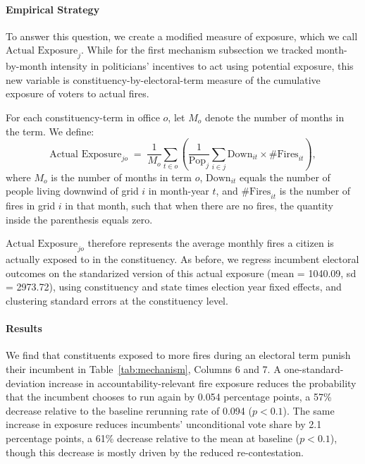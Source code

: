\documentclass[12pt]{article}
\begin{document}
\paragraph{Empirical Strategy}
To answer this question, we create a modified measure of exposure, which we call $\text{Actual Exposure}_{j}$. While for the first mechanism subsection we tracked month-by-month intensity in politicians' incentives to act using potential exposure, this new variable is constituency-by-electoral-term measure of the cumulative exposure of voters to actual fires. %

For each constituency-term in office $o$, let $M_o$ denote the number of months in the term. We define:
\begin{equation}
\text{Actual Exposure}_{jo} \;=\; \frac{1}{M_o} \sum_{t \in o} 
\left( \frac{1}{\text{Pop}_j} \sum_{i \in j} \text{Down}_{it} \times \text{\#Fires}_{it} \right),
\label{eq:actexposure}
\end{equation}
where $M_o$ is the number of months in term $o$, $\text{Down}_{it}$ equals the number of people living downwind of grid $i$ in month-year $t$, and $\text{\#Fires}_{it}$ is the number of fires in grid $i$ in that month, such that when there are no fires, the quantity inside the parenthesis equals zero. 

$\text{Actual Exposure}_{jo}$ therefore represents the average monthly fires a citizen is actually exposed to in the constituency. As before, we regress incumbent electoral outcomes on the standarized version of this actual exposure (mean = 1040.09, sd = 2973.72), using constituency and state times election year fixed effects, and clustering standard errors at the constituency level.

\paragraph{Results}
We find that constituents exposed to more fires during an electoral term punish their incumbent in Table~\ref{tab:mechanism}, Columns 6 and 7. A one-standard-deviation increase in accountability-relevant fire exposure reduces the probability that the incumbent chooses to run again by 0.054 percentage points, a 57\% decrease relative to the baseline rerunning rate of 0.094 ($p<0.1$). The same increase in exposure reduces incumbents' unconditional vote share by 2.1 percentage points, a 61\% decrease relative to the mean at baseline ($p<0.1$), though this decrease is mostly driven by the reduced re-contestation.
\end{document}
